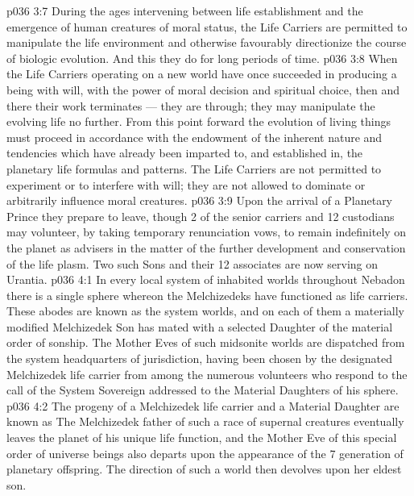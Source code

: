 \vs p036 3:7 During the ages intervening between life establishment and the emergence of human creatures of moral status, the Life Carriers are permitted to manipulate the life environment and otherwise favourably directionize the course of biologic evolution. And this they do for long periods of time.
\vs p036 3:8 When the Life Carriers operating on a new world have once succeeded in producing a being with will, with the power of moral decision and spiritual choice, then and there their work terminates --- they are through; they may manipulate the evolving life no further. From this point forward the evolution of living things must proceed in accordance with the endowment of the inherent nature and tendencies which have already been imparted to, and established in, the planetary life formulas and patterns. The Life Carriers are not permitted to experiment or to interfere with will; they are not allowed to dominate or arbitrarily influence moral creatures.
\vs p036 3:9 Upon the arrival of a Planetary Prince they prepare to leave, though 2 of the senior carriers and 12 custodians may volunteer, by taking temporary renunciation vows, to remain indefinitely on the planet as advisers in the matter of the further development and conservation of the life plasm. Two such Sons and their 12 associates are now serving on Urantia.
\vs p036 4:1 In every local system of inhabited worlds throughout Nebadon there is a single sphere whereon the Melchizedeks have functioned as life carriers. These abodes are known as the system  worlds, and on each of them a materially modified Melchizedek Son has mated with a selected Daughter of the material order of sonship. The Mother Eves of such midsonite worlds are dispatched from the system headquarters of jurisdiction, having been chosen by the designated Melchizedek life carrier from among the numerous volunteers who respond to the call of the System Sovereign addressed to the Material Daughters of his sphere.
\vs p036 4:2 The progeny of a Melchizedek life carrier and a Material Daughter are known as  The Melchizedek father of such a race of supernal creatures eventually leaves the planet of his unique life function, and the Mother Eve of this special order of universe beings also departs upon the appearance of the 7 generation of planetary offspring. The direction of such a world then devolves upon her eldest son.
